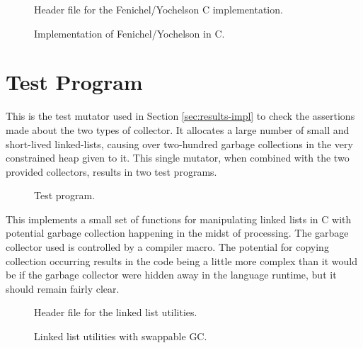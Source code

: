 
\begin{figure}[H]
  \captionsetup{format=default}
  \caption{Header file for the Fenichel/Yochelson C implementation.}
  \label{fig:fenichel-yochelson-h}
\end{figure}


\begin{figure}[H]
  \captionsetup{format=default}
  \caption{Implementation of Fenichel/Yochelson in C.}
  \label{fig:fenichel-yochelson-c}
\end{figure}

\section{Test Program}
\label{sec:gc-impl-test-program}

This is the test mutator used in Section \ref{sec:results-impl} to
check the assertions made about the two types of collector. It
allocates a large number of small and short-lived linked-lists,
causing over two-hundred garbage collections in the very constrained
heap given to it. This single mutator, when combined with the two
provided collectors, results in two test programs.


\begin{figure}[H]
  \captionsetup{format=default}
  \caption{Test program.}
  \label{fig:main-c}
\end{figure}

This implements a small set of functions for manipulating linked lists
in C with potential garbage collection happening in the midst of
processing. The garbage collector used is controlled by a compiler
macro. The potential for copying collection occurring results in the
code being a little more complex than it would be if the garbage
collector were hidden away in the language runtime, but it should
remain fairly clear.


\vspace{-0.3cm}
\begin{figure}[H]
  \captionsetup{format=default}
  \caption{Header file for the linked list utilities.}
  \label{fig:lists-h}
\end{figure}


\begin{figure}[H]
  \captionsetup{format=default}
  \caption{Linked list utilities with swappable GC.}
  \label{fig:lists-h}
\end{figure}


